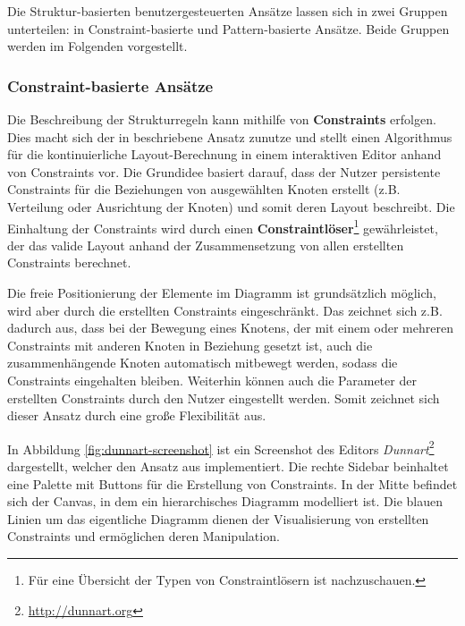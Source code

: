 Die Struktur-basierten benutzergesteuerten Ansätze lassen sich in zwei Gruppen unterteilen: in Constraint-basierte und Pattern-basierte Ansätze. Beide Gruppen werden im Folgenden vorgestellt.

\subsubsection{Constraint-basierte Ansätze}
\label{subsubsec:constraint-based-approaches}

Die Beschreibung der Strukturregeln kann mithilfe von \textbf{Constraints} erfolgen. Dies macht sich der in \cite{Wybrow08Using} beschriebene Ansatz zunutze und stellt einen Algorithmus für die kontinuierliche Layout-Berechnung in einem interaktiven Editor anhand von Constraints vor. Die Grundidee basiert darauf, dass der Nutzer persistente Constraints für die Beziehungen von ausgewählten Knoten erstellt (z.B. Verteilung oder Ausrichtung der Knoten) und somit deren Layout beschreibt. Die Einhaltung der Constraints wird durch einen \textbf{Constraintlöser}\footnote{Für eine Übersicht der Typen von Constraintlösern ist \cite[S.18ff]{Maier12A-Pattern-based} nachzuschauen.} gewährleistet, der das valide Layout anhand der Zusammensetzung von allen erstellten Constraints berechnet.

Die freie Positionierung der Elemente im Diagramm ist grundsätzlich 
möglich, wird aber durch die erstellten Constraints eingeschränkt. Das zeichnet sich z.B. dadurch aus, dass bei der Bewegung eines Knotens, der mit einem oder mehreren Constraints mit anderen Knoten in Beziehung gesetzt ist, auch die zusammenhängende Knoten automatisch mitbewegt werden, sodass die Constraints eingehalten bleiben. Weiterhin können auch die Parameter der erstellten Constraints durch den Nutzer eingestellt werden. Somit zeichnet sich dieser Ansatz durch eine große Flexibilität aus.

In Abbildung \ref{fig:dunnart-screenshot} ist ein Screenshot des Editors \textit{Dunnart}\footnote{\url{http://dunnart.org}} dargestellt, welcher den Ansatz aus \cite{Wybrow08Using} implementiert. Die rechte Sidebar beinhaltet eine Palette mit Buttons für die Erstellung von Constraints. In der Mitte befindet sich der Canvas, in dem ein hierarchisches Diagramm modelliert ist. Die blauen Linien um das eigentliche Diagramm dienen der Visualisierung von erstellten Constraints und ermöglichen deren Manipulation.

